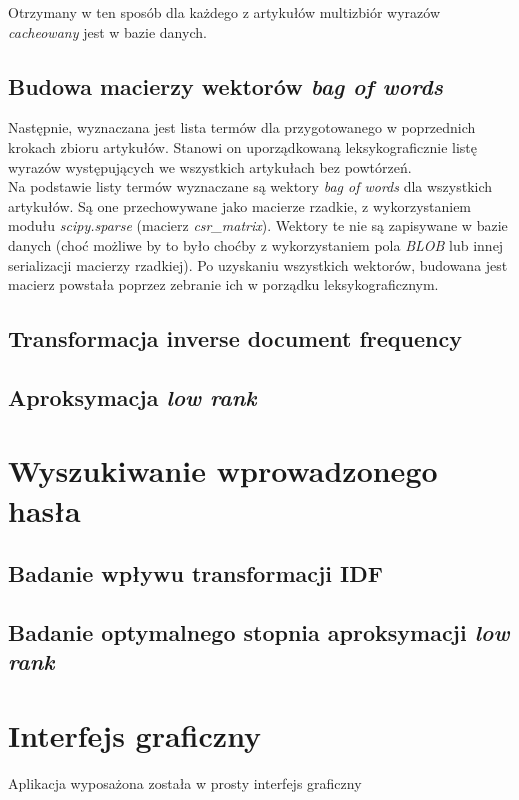 \documentclass{article}
\begin{document}
        Otrzymany w ten sposób dla każdego z artykułów multizbiór wyrazów \textit{cacheowany} jest w bazie danych.
    
        \subsection{Budowa macierzy wektorów \textit{bag of words}}
        Następnie, wyznaczana jest lista termów dla przygotowanego w poprzednich krokach zbioru artykułów. Stanowi on uporządkowaną leksykograficznie listę wyrazów występujących we wszystkich artykułach bez powtórzeń.\\
        
        Na podstawie listy termów wyznaczane są wektory \textit{bag of words} dla wszystkich artykułów. Są one przechowywane jako macierze rzadkie, z wykorzystaniem modułu \textit{scipy.sparse} (macierz \textit{csr\_matrix}). Wektory te nie są zapisywane w bazie danych (choć możliwe by to było choćby z wykorzystaniem pola \textit{BLOB} lub innej serializacji macierzy rzadkiej). Po uzyskaniu wszystkich wektorów, budowana jest macierz powstała poprzez zebranie ich w porządku leksykograficznym. 
        
        \subsection{Transformacja inverse document frequency}
        
        \subsection{Aproksymacja \textit{low rank}}
        
    \section{Wyszukiwanie wprowadzonego hasła}
        \subsection{Badanie wpływu transformacji IDF}
        
        \subsection{Badanie optymalnego stopnia aproksymacji \textit{low rank}}
    
    \section{Interfejs graficzny}
        Aplikacja wyposażona została w prosty interfejs graficzny 
    
\end{document}
